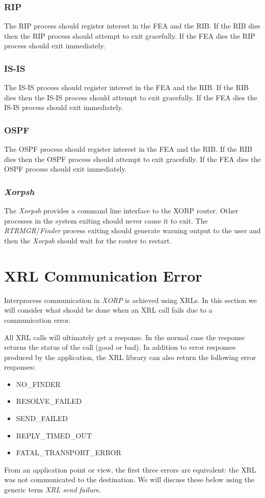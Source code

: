 \documentclass[11pt]{article}
\makeatletter
\newcommand{\xorp} {{\em XORP}\@\xspace}
\newcommand{\finder} {{\em Finder}\@\xspace}
\newcommand{\xorpsh} {{\em Xorpsh}\@\xspace}
\newcommand{\rtrmgr} {{\em RTRMGR}\@\xspace}
\makeatother
\begin{document}
\subsubsection{RIP}

The RIP process should register interest in the FEA and the RIB. If
the RIB dies then the RIP process should attempt to exit gracefully.
If the FEA dies the RIP process should exit immediately.

\subsubsection{IS-IS}

The IS-IS process should register interest in the FEA and the RIB. If
the RIB dies then the IS-IS process should attempt to exit gracefully.
If the FEA dies the IS-IS process should exit immediately.

\subsubsection{OSPF}

The OSPF process should register interest in the FEA and the RIB. If
the RIB dies then the OSPF process should attempt to exit gracefully.
If the FEA dies the OSPF process should exit immediately.

\subsubsection{\label{xorpsh}\xorpsh}

The \xorpsh provides a command line interface to the XORP router.
Other processes in the system exiting should never cause it to
exit. The \rtrmgr/\finder process exiting should generate
warning output to the user and then the \xorpsh should wait for the
router to restart.

\section{XRL Communication Error}
Interprocess communication in \xorp is achieved using XRLs. In this
section we will consider what should be done when an XRL call fails
due to a communication error.

All XRL calls will ultimately get a response. In the normal case the
response returns the status of the call (good or bad). In addition to
error responses produced by the application, the XRL library can also
return the following error responses:
\begin{itemize}
\item NO\_FINDER
\item RESOLVE\_FAILED
\item SEND\_FAILED
\item REPLY\_TIMED\_OUT
\item FATAL\_TRANSPORT\_ERROR
\end{itemize}
From an application point or view, the first three errors are
equivalent: the XRL was not communicated to the destination.  We will
discuss these below using the generic term {\em XRL send failure}.
\end{document}
